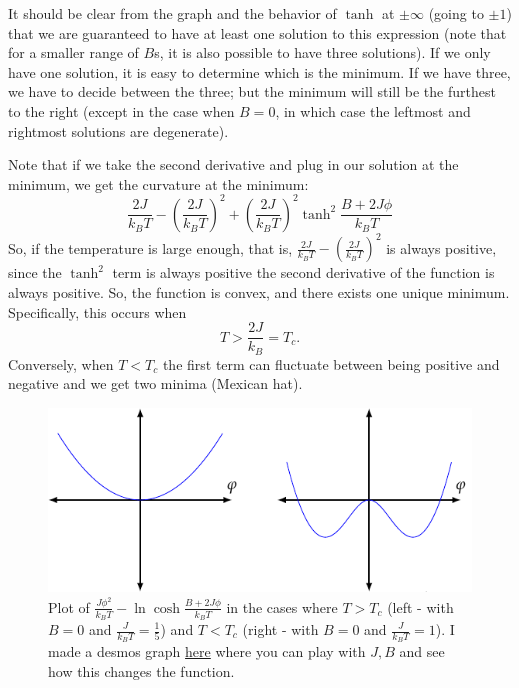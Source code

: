 It should be clear from the graph and the behavior of $\tanh$ at $\pm \infty$ (going to $\pm 1$) that we are guaranteed to have at least one solution to this expression (note that for a smaller range of $B$s, it is also possible to have three solutions). If we only have one solution, it is easy to determine which is the minimum. If we have three, we have to decide between the three; but the minimum will still be the furthest to the right (except in the case when $B = 0$, in which case the leftmost and rightmost solutions are degenerate).

Note that if we take the second derivative and plug in our solution at the minimum, we get the curvature at the minimum:
\begin{equation}
    \frac{2J}{k_B T} - \left(\frac{2J}{k_B T}\right)^2 + \left(\frac{2J}{k_B T}\right)^2\tanh^2\frac{B + 2J\phi}{k_B T}
\end{equation}
So, if the temperature is large enough, that is, $\frac{2J}{k_B T} - \left(\frac{2J}{k_B T}\right)^2$ is always positive, since the $\tanh^2$ term is always positive the second derivative of the function is always positive. So, the function is convex, and there exists one unique minimum. Specifically, this occurs when 
\begin{equation}
    T > \frac{2J}{k_B} = T_c.
\end{equation}
Conversely, when $T < T_c$ the first term can fluctuate between being positive and negative and we get two minima (Mexican hat).

\begin{figure}[htbp]
    \centering
    \includegraphics{Images/fig-infIsingphasetrans.pdf}


    \caption{Plot of $\frac{J\phi^2}{k_B T} - \ln\cosh\frac{B + 2J\phi}{k_B T}$ in the cases where $T > T_c$ (left - with $B = 0$ and $\frac{J}{k_B T} = \frac{1}{5}$) and $T < T_c$ (right - with $B = 0$ and $\frac{J}{k_BT} = 1$). I made a desmos graph \href{https://www.desmos.com/calculator/5d74tk33yd}{here} where you can play with $J, B$ and see how this changes the function.}
    \label{fig-infIsingphasetrans}
\end{figure}

